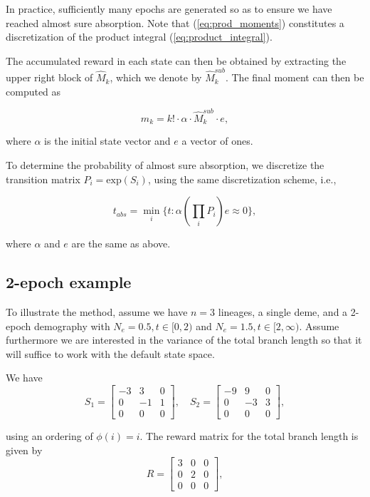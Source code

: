 \documentclass[hidelinks,11pt]{article}
\begin{document}
In practice, sufficiently many epochs are generated so as to ensure we have reached almost sure absorption. Note that (\ref{eq:prod_moments}) constitutes a discretization of the product integral (\ref{eq:product_integral}). 

The accumulated reward in each state can then be obtained by extracting the upper right block of $\hat{M}_k$, which we denote by $\hat{M}_k^{sub}$. The final moment can then be computed as

\begin{equation*}
m_k = k! \cdot \alpha \cdot \hat{M}_k^{sub} \cdot e,
\end{equation*}

where $\alpha$ is the initial state vector and $e$ a vector of ones.

To determine the probability of almost sure absorption, we discretize the transition matrix $P_i = \text{exp}(S_i)$, using the same discretization scheme, i.e.,

\begin{equation*}
t_{abs} = \min_i\{t: \alpha (\prod_i P_i) e \approx 0 \},
\end{equation*}

where $\alpha$ and $e$ are the same as above.

\subsection{2-epoch example}
To illustrate the method, assume we have $n=3$ lineages, a single deme, and a 2-epoch demography with $N_e = 0.5, t \in [0, 2)$ and $N_e = 1.5, t \in [2, \infty)$. Assume furthermore we are interested in the variance of the total branch length so that it will suffice to work with the default state space. 

We have 
\begin{equation*}
S_1 = \begin{bmatrix} -3 & 3 & 0 \\ 0 & -1 & 1 \\ 0 & 0 & 0 \end{bmatrix}, \quad S_2 = \begin{bmatrix} -9 & 9 & 0 \\ 0 & -3 & 3 \\ 0 & 0 & 0 \end{bmatrix},
\end{equation*}

using an ordering of $\phi(i) = i$. The reward matrix for the total branch length is given by
\begin{equation*}
R = \begin{bmatrix} 3 & 0 & 0 \\ 0 & 2 & 0 \\ 0 & 0 & 0 \end{bmatrix},
\end{equation*}
\end{document}
